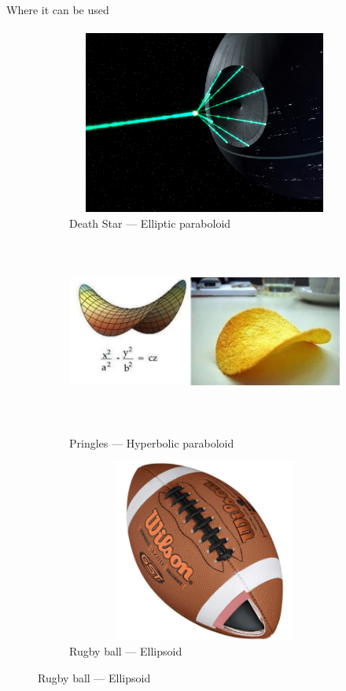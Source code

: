 \documentclass[aspectratio=169]{beamer}
\begin{document}
\begin{frame}[t]{Where it can be used}
\framesubtitle{}
    \begin{figure}[H]
        \begin{subfigure}{0.32\textwidth}
            \centering\includegraphics[height=6cm,width=1\textwidth,keepaspectratio]{deathstar.png}
            \caption*{Death Star --- Elliptic paraboloid}
            \label{fig:deathstar.png}
        \end{subfigure}
        \begin{subfigure}{0.32\textwidth}
            \href{https://www.youtube.com/watch?v=DiDU9b6BFLI}{
                \centering\includegraphics[height=6cm,width=1\textwidth,keepaspectratio]{pringles.jpg}}
            \caption*{Pringles --- Hyperbolic paraboloid}
            \label{fig:pringles.jpg}
        \end{subfigure}
        \begin{subfigure}{0.32\textwidth}
            \centering\includegraphics[height=6cm,width=1\textwidth,keepaspectratio]{rugby.jpg}
            \caption*{Rugby ball --- Ellipsoid}
            \label{fig:rugby.rugby}
        \end{subfigure}
    \end{figure}
\end{frame}
\end{document}
